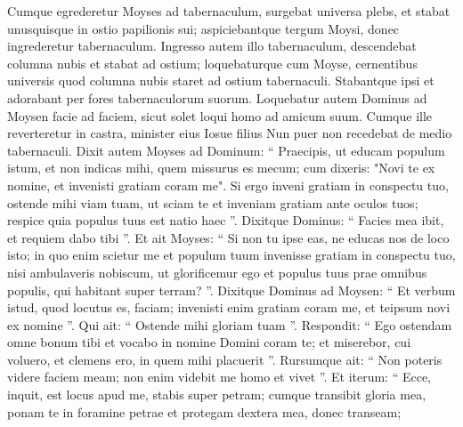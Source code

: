 \begin{biblechapter}
\begin{biblechapter}
\begin{biblechapter}
\begin{biblechapter}
\begin{biblechapter}
\begin{biblechapter}
\begin{biblechapter}
\begin{biblechapter}
\begin{biblechapter}
\begin{biblechapter}
\begin{biblechapter}
\begin{biblechapter}
\begin{biblechapter}
\begin{biblechapter}
\begin{biblechapter}
\begin{biblechapter}
\begin{biblechapter}
\begin{biblechapter}
\begin{biblechapter}
\begin{biblechapter}
\begin{biblechapter}
\begin{biblechapter}
\begin{biblechapter}
\begin{biblechapter}
\begin{biblechapter}
\begin{biblechapter}
\begin{biblechapter}
\begin{biblechapter}
\begin{biblechapter}
\begin{biblechapter}
\begin{biblechapter}
\begin{biblechapter}
\begin{biblechapter}
\verse Cumque egrederetur Moyses ad tabernaculum, surgebat universa plebs, et stabat unusquisque in ostio papilionis sui; aspiciebantque tergum Moysi, donec ingrederetur tabernaculum. 
\verse Ingresso autem illo tabernaculum, descendebat columna nubis et stabat ad ostium; loquebaturque cum Moyse, 
\verse cernentibus universis quod columna nubis staret ad ostium tabernaculi. Stabantque ipsi et adorabant per fores tabernaculorum suorum. 
\verse Loquebatur autem Dominus ad Moysen facie ad faciem, sicut solet loqui homo ad amicum suum. Cumque ille reverteretur in castra, minister eius Iosue filius Nun puer non recedebat de medio tabernaculi.
 \verse Dixit autem Moyses ad Dominum: “ Praecipis, ut educam populum istum, et non indicas mihi, quem missurus es mecum; cum dixeris: "Novi te ex nomine, et invenisti gratiam coram me". 
\verse Si ergo inveni gratiam in conspectu tuo, ostende mihi viam tuam, ut sciam te et inveniam gratiam ante oculos tuos; respice quia populus tuus est natio haec ”. 
\verse Dixitque Dominus: “ Facies mea ibit, et requiem dabo tibi ”. 
\verse Et ait Moyses: “ Si non tu ipse eas, ne educas nos de loco isto; 
\verse in quo enim scietur me et populum tuum invenisse gratiam in conspectu tuo, nisi ambulaveris nobiscum, ut glorificemur ego et populus tuus prae omnibus populis, qui habitant super terram? ”.
 \verse Dixitque Dominus ad Moysen: “ Et verbum istud, quod locutus es, faciam; invenisti enim gratiam coram me, et teipsum novi ex nomine ”. 
\verse Qui ait: “ Ostende mihi gloriam tuam ”. 
\verse Respondit: “ Ego ostendam omne bonum tibi et vocabo in nomine Domini coram te; et miserebor, cui voluero, et clemens ero, in quem mihi placuerit ”. 
\verse Rursumque ait: “ Non poteris videre faciem meam; non enim videbit me homo et vivet ”. 
\verse Et iterum: “ Ecce, inquit, est locus apud me, stabis super petram; 
\verse cumque transibit gloria mea, ponam te in foramine petrae et protegam dextera mea, donec transeam; 

\end{biblechapter}
\end{biblechapter}
\end{biblechapter}
\end{biblechapter}
\end{biblechapter}
\end{biblechapter}
\end{biblechapter}
\end{biblechapter}
\end{biblechapter}
\end{biblechapter}
\end{biblechapter}
\end{biblechapter}
\end{biblechapter}
\end{biblechapter}
\end{biblechapter}
\end{biblechapter}
\end{biblechapter}
\end{biblechapter}
\end{biblechapter}
\end{biblechapter}
\end{biblechapter}
\end{biblechapter}
\end{biblechapter}
\end{biblechapter}
\end{biblechapter}
\end{biblechapter}
\end{biblechapter}
\end{biblechapter}
\end{biblechapter}
\end{biblechapter}
\end{biblechapter}
\end{biblechapter}
\end{biblechapter}
